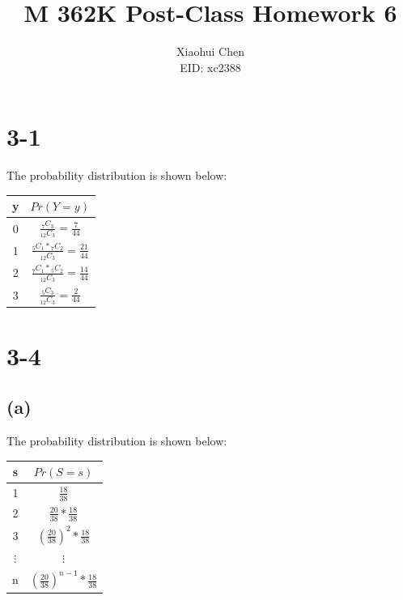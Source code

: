 \documentclass[12pt]{article}
\author{Xiaohui Chen \\EID: xc2388}
\title{M 362K Post-Class Homework 6}
\begin{document}
\maketitle
\begin{spacing}{2.0}

\section*{3-1}
The probability distribution is shown below:

\begin{tabular}{|c|c|}
  \hline
  y & $Pr(Y=y)$ \\
  \hline
  0 & $\frac{{}_{7}C_{3}}{{}_{12}C_{3}}= \frac{7}{44}$ \\
  \hline
  1 & $\frac{{}_{5}C_{1}*{}_{7}C_{2}}{{}_{12}C_{3}}= \frac{21}{44}$ \\
  \hline
  2 & $\frac{{}_{7}C_{1}*{}_{5}C_{2}}{{}_{12}C_{3}}= \frac{14}{44}$ \\
  \hline
  3 & $\frac{{}_{5}C_{3}}{{}_{12}C_{3}}= \frac{2}{44}$ \\
  \hline
\end{tabular}

\section*{3-4}

\subsection*{(a)}

The probability distribution is shown below:

\begin{tabular}{|c|c|}
  \hline
  s & $Pr(S=s)$ \\
  \hline
  1 & $\frac{18}{38}$ \\
  \hline
  2 & $\frac{20}{38}*\frac{18}{38}$ \\
  \hline
  3 & $\left(\frac{20}{38}\right)^2*\frac{18}{38}$ \\
  \hline
  $\vdots$ & $\vdots$ \\
  \hline
  n & $\left(\frac{20}{38}\right)^{n-1}*\frac{18}{38}$ \\
  \hline
\end{tabular}


\end{spacing}
\end{document}
